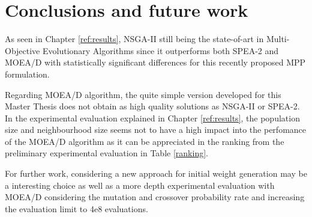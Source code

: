 \section{Conclusions and future work}

As seen in Chapter \ref{ref:results}, NSGA-II still being the state-of-art in Multi-Objective Evolutionary Algorithms since it outperforms both SPEA-2 and MOEA/D with statistically significant differences for this recently proposed MPP formulation.

Regarding MOEA/D algorithm, the quite simple version developed for this Master Thesis does not obtain as high quality solutions as NSGA-II or SPEA-2. In the experimental evaluation explained in Chapter \ref{ref:results}, the population size and neighbourhood size seems not to have a high impact into the perfomance of the MOEA/D algorithm as it can be appreciated in the ranking from the preliminary experimental evaluation in Table \ref{ranking}. 

For further work, considering a new approach for initial weight generation may be a interesting choice as well as a more depth experimental evaluation with MOEA/D considering the mutation and crossover probability rate and increasing the evaluation limit to 4e8 evaluations.
 